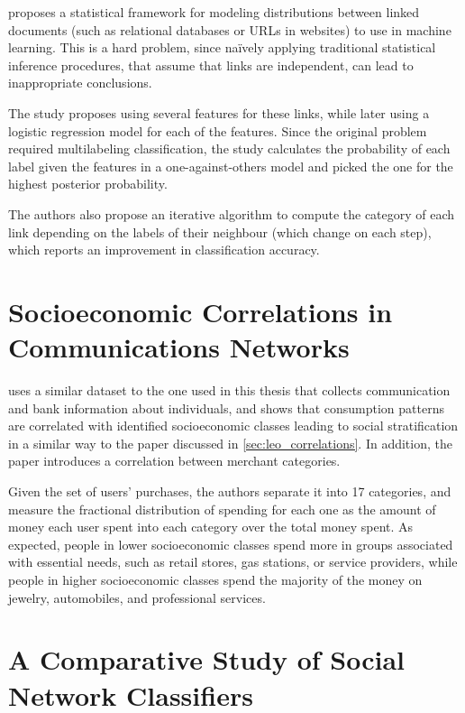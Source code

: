 \cite{lu2003link} proposes a statistical framework for modeling distributions between linked documents (such as relational databases or URLs in websites) to use in machine learning. This is a hard problem, since naïvely applying traditional statistical inference procedures, that assume that links are independent, can lead to inappropriate conclusions\cite{jensen1999statistical}.

The study proposes using several features for these links, while later using a logistic regression model for each of the features. Since the original problem required multilabeling classification, the study calculates the probability of each label given the features in a one-against-others model and picked the one for the highest posterior probability.

The authors also propose an iterative algorithm to compute the category of each link depending on the labels of their neighbour (which change on each step), which reports an improvement in classification accuracy.

\section{Socioeconomic Correlations in Communications Networks}

\cite{leo2015socioeconomic} uses a similar dataset to the one used in this thesis that collects communication and bank information about individuals, and shows that consumption patterns are correlated with identified socioeconomic classes leading to social stratification in a similar way to the paper discussed in \cref{sec:leo_correlations}.
In addition, the paper introduces a correlation between merchant categories.

Given the set of users' purchases, the authors separate it into 17 categories, and measure the fractional distribution of spending for each one as the amount of money each user spent into each category over the total money spent.
As expected, people in lower socioeconomic classes spend more in groups associated with essential needs, such as retail stores, gas stations, or service providers, while people in higher socioeconomic classes spend the majority of the money on jewelry, automobiles, and professional services.

\section{A Comparative Study of Social Network Classifiers}

